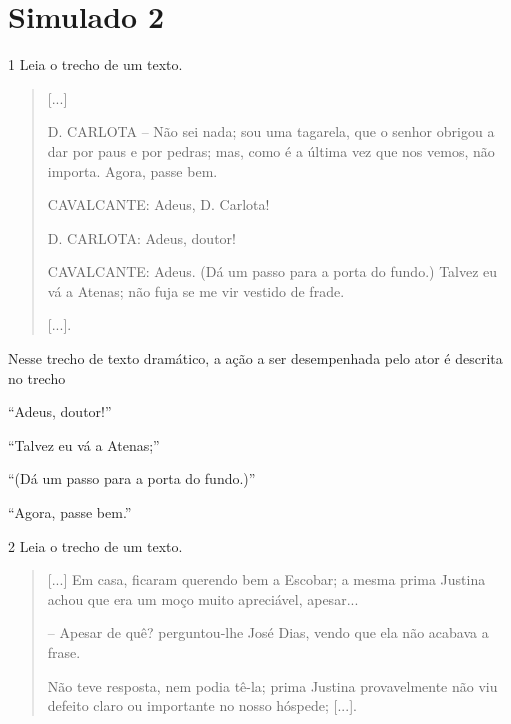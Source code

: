 \chapter{Simulado 2}

\num{1} Leia o trecho de um texto.

\begin{quote}
{[}...{]}

D. CARLOTA – Não sei nada; sou uma tagarela, que o senhor obrigou a
dar por paus e por pedras; mas, como é a última vez que nos vemos, não
importa. Agora, passe bem.

CAVALCANTE: Adeus, D. Carlota!

D. CARLOTA: Adeus, doutor!

CAVALCANTE: Adeus. (Dá um passo para a porta do fundo.) Talvez eu vá a
Atenas; não fuja se me vir vestido de frade.

{[}...{]}.

\end{quote}

Nesse trecho de texto dramático, a ação a ser desempenhada pelo ator é descrita
no trecho

\begin{minipage}{.5\textwidth}
\begin{escolha}
\item “Adeus, doutor!”

\item “Talvez eu vá a Atenas;”

\item “(Dá um passo para a porta do fundo.)”

\item “Agora, passe bem.”
\end{escolha}
\end{minipage}

\num{2} Leia o trecho de um texto.

\begin{quote}
{[}...{]} Em casa, ficaram querendo bem a Escobar; a mesma prima
Justina achou que era um moço muito apreciável, apesar...

– Apesar de quê? perguntou-lhe José Dias, vendo que ela não acabava a frase.

Não teve resposta, nem podia tê-la; prima Justina provavelmente não viu
defeito claro ou importante no nosso hóspede; {[}...{]}.

\end{quote}

